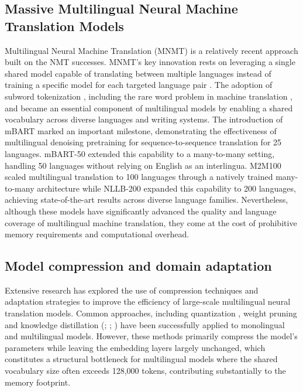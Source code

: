 \documentclass{article}
\begin{document}
	\subsection{Massive Multilingual Neural Machine Translation Models}
	Multilingual Neural Machine Translation (MNMT) is a relatively recent approach built on the
	NMT successes. MNMT's key innovation rests on leveraging a single shared model capable
	of translating between multiple languages instead of training a specific model for each
	targeted language pair \citep{firat2016multiway, johnson2017google}. The adoption of subword tokenization \citep{kudo2018subword}, including the rare word problem in machine translation \citep{jean2015addressing}, and became an essential component of multilingual models by enabling a shared vocabulary across diverse languages and writing systems. The introduction of mBART
	\citep{liu2020multilingual} marked an important milestone, demonstrating the effectiveness of
	multilingual denoising pretraining for sequence-to-sequence translation for 25 languages.
	mBART-50 \citep{tang2021multilingual} extended this capability to a many-to-many setting, handling
	50 languages without relying on English as an interlingua. M2M100 \citep{fan2021beyond} scaled
	multilingual translation to 100 languages through a natively trained many-to-many
	architecture while NLLB-200 \citep{nllb2022no} expanded this capability to 200
	languages, achieving state-of-the-art results across diverse language families. Nevertheless,
	although these models have significantly advanced the quality and language coverage of
	multilingual machine translation, they come at the cost of prohibitive memory requirements
	and computational overhead.
	
	\subsection{Model compression and domain adaptation}
	Extensive research has explored the use of compression techniques and adaptation strategies
	to improve the efficiency of large-scale multilingual neural translation models. Common
	approaches, including quantization \citep{zafrir2019q8bert, shen2020qbert, mohammadshahi2022what, prato2020fully},
	weight pruning \citep{see2016compression, voita2019analyzing, behnke2020losing, khan2021more}
	and knowledge distillation (\citealp{hinton2015distilling}; \citealp{kim2016sequence}; \citealp{tan2019multilingual}) have
	been successfully applied to monolingual and multilingual models. However, these methods
	primarily compress the model's parameters while leaving the embedding layers largely
	unchanged, which constitutes a structural bottleneck for multilingual models where the shared
	vocabulary size often exceeds 128,000 tokens, contributing substantially to the memory
	footprint.
	
\end{document}
